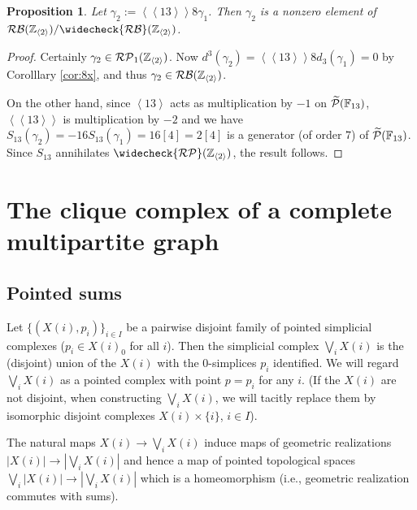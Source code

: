 \documentclass[12pt]{amsart}
\newtheorem{prop}[lem]{Proposition}
\theoremstyle{definition}
\newcommand{\F}[1]{\Bbb{F}_{#1}}
\newcommand{\Z}{\Bbb{Z}}
\newcommand{\qpb}[1]{\widetilde{\mathcal{P}}(#1)}%
\newcommand{\rpbker}[1]{\mathcal{RP}_1(#1)}%
\newcommand{\crpb}[1]{\widecheck{\mathcal{RP}}(#1)}
\newcommand{\rbl}[1]{{\mathcal{RB}}(#1)}%
\newcommand{\crbl}[1]{\widecheck{\mathcal{RB}}(#1)}
\newcommand{\gpb}[1]{\left[ #1\right]} %
\newcommand{\<}{\langle}
\renewcommand{\>}{\rangle}
\newcommand{\an}[1]{\left\langle{#1}\right\rangle}
\newcommand{\pf}[1]{\left\langle\!\left\langle{#1}\right\rangle\!\right\rangle}
\begin{document}
\begin{prop}\label{prop:gamma2}
 Let $\gamma_2:=\pf{13}8\gamma_1$. Then $\gamma_2$ is a nonzero element of ${\rbl{\Z_{\an{2}}}}/{\crbl{\Z_{\an{2}}}}$.
\end{prop}
\begin{proof} Certainly $\gamma_2\in \rpbker{\Z_{\an{2}}}$. Now $d^3(\gamma_2)=\pf{13}8d_3(\gamma_1)=0$ by Corolllary \ref{cor:8x}, and thus $\gamma_2\in \rbl{\Z_{\an{2}}}$.

 On the other hand, 
since $\an{13}$ acts as multiplication by $-1$ on $\qpb{\F{13}}$, $\pf{13}$ is multiplication by $-2$ and we have $S_{13}(\gamma_2)=-16S_{13}(\gamma_1)=16\gpb{4}=2\gpb{4}$ is a generator (of order $7$) of $\qpb{\F{13}}$.
Since $S_{13}$ annihilates $\crpb{\Z_{\an{2}}}$, the result follows.
\end{proof}



\appendix

\section{The clique complex of a complete multipartite graph}\label{app:clique}

\subsection{Pointed sums}   Let $\{ (X(i),p_i)\}_{i\in I}$ be a pairwise disjoint family of pointed simplicial complexes ($p_i\in X(i)_0$ for all $i$). Then the simplicial complex $\bigvee_i X(i)$  is the (disjoint) union of the $X(i)$ with the $0$-simplices $p_i$ identified. We will regard $\bigvee_i X(i)$ as a pointed complex with point $p=p_i$ for any $i$.
(If the $X(i)$ are not disjoint, when constructing $\bigvee_i X(i)$, we will tacitly replace them by isomorphic disjoint complexes $X(i)\times \{ i\}$, $i\in I$).

The natural maps $X(i)\to \bigvee_i X(i)$ induce maps of geometric realizations $|X(i)|\to |\bigvee_i X(i)|$ and hence a map of pointed topological spaces $\bigvee_i|X(i)|\to |\bigvee_i X(i)|$ 
which is a homeomorphism (i.e., geometric realization commutes with sums).
\end{document}
